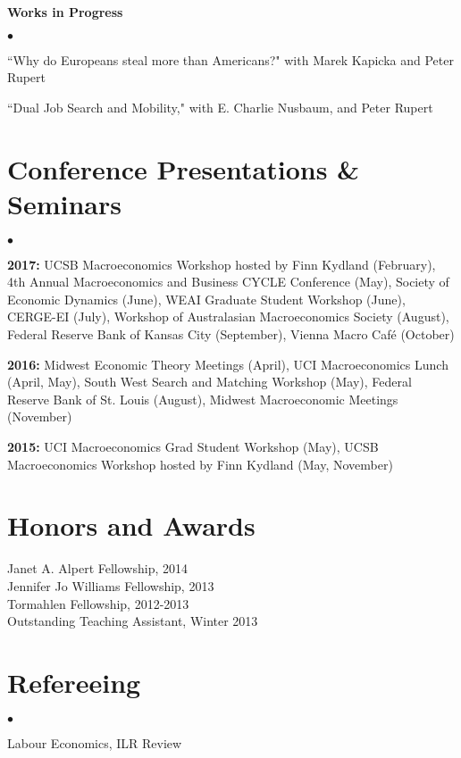 \documentclass[margin,line]{res}
\newenvironment{list2}{
  \begin{list}{$\bullet$}{%
      \setlength{\itemsep}{0.05in}
      \setlength{\parsep}{0in} \setlength{\parskip}{0in}
      \setlength{\topsep}{0in} \setlength{\partopsep}{0in} 
      \setlength{\leftmargin}{0.2in}}}{\end{list}}
\begin{document}
\begin{resume}
{\bf Works in Progress}\vspace{0.1em}\\
\begin{list2}
\item ``Why do Europeans steal more than Americans?" with Marek Kapicka and Peter Rupert
\item ``Dual Job Search and Mobility," with E. Charlie Nusbaum, and Peter Rupert
\end{list2}
\section{\sc Conference Presentations \& Seminars}
\begin{list2}
\item {\bf 2017:} UCSB Macroeconomics Workshop hosted by Finn Kydland (February), 4th Annual Macroeconomics and Business CYCLE Conference (May), Society of Economic Dynamics (June), WEAI Graduate Student Workshop (June), CERGE-EI (July), Workshop of Australasian Macroeconomics Society (August), Federal Reserve Bank of Kansas City (September), Vienna Macro Caf\'e (October)
\item {\bf 2016:} Midwest Economic Theory Meetings (April), UCI Macroeconomics Lunch (April, May), South West Search and Matching Workshop (May), Federal Reserve Bank of St. Louis (August), Midwest Macroeconomic Meetings (November)
\item {\bf 2015:} UCI Macroeconomics Grad Student Workshop (May), UCSB Macroeconomics Workshop hosted by Finn Kydland (May, November)
\end{list2}
\section{\sc Honors and Awards} 
Janet A. Alpert Fellowship, 2014 \\
Jennifer Jo Williams Fellowship, 2013\\
Tormahlen Fellowship, 2012-2013\\
Outstanding Teaching Assistant, Winter 2013

\section{\sc Refereeing}
\begin{list2}
\item Labour Economics, ILR Review
\end{list2}


\end{resume}
\end{document}
